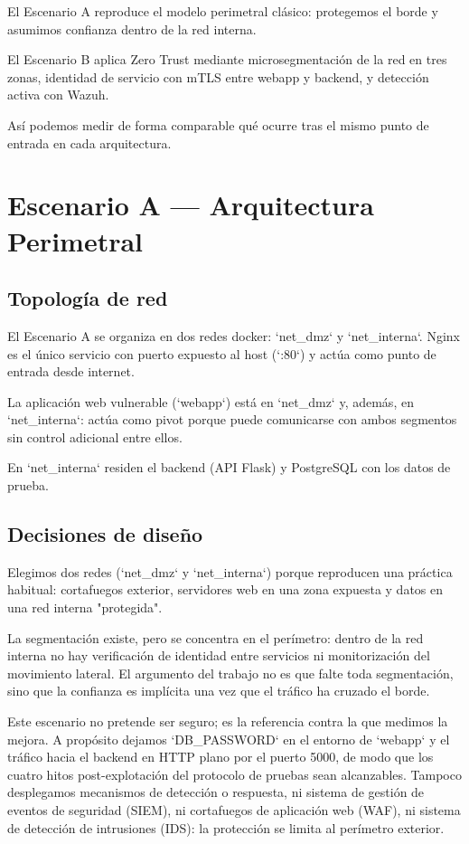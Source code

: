 \documentclass[11pt,spanish,listoffigures,listoftables]{tfgetsinf}
\begin{document}
    El Escenario A reproduce el modelo perimetral clásico: protegemos el borde y asumimos confianza dentro de la red interna. 
    
    El Escenario B aplica Zero Trust mediante microsegmentación de la red en tres zonas, identidad de servicio con mTLS entre webapp y backend, y detección activa con Wazuh. 
    
    Así podemos medir de forma comparable qué ocurre tras el mismo punto de entrada en cada arquitectura.
    
    \section{Escenario A — Arquitectura Perimetral}
        \subsection{Topología de red}
            El Escenario A se organiza en dos redes docker: `net\_dmz` y `net\_interna`. Nginx es el único servicio con puerto expuesto al host (`:80`) y actúa como punto de entrada desde internet.
            
            La aplicación web vulnerable (`webapp`) está en `net\_dmz` y, además, en `net\_interna`: actúa como pivot porque puede comunicarse con ambos segmentos sin control adicional entre ellos. 
            
            En `net\_interna` residen el backend (API Flask) y PostgreSQL con los datos de prueba.
        
        \subsection{Decisiones de diseño}
        Elegimos dos redes (`net\_dmz` y `net\_interna`) porque reproducen una práctica habitual: cortafuegos exterior, servidores web en una zona expuesta y datos en una red interna "protegida".
        
        La segmentación existe, pero se concentra en el perímetro: dentro de la red interna no hay verificación de identidad entre servicios ni monitorización del movimiento lateral. El argumento del trabajo no es que falte toda segmentación, sino que la confianza es implícita una vez que el tráfico ha cruzado el borde.
        
        Este escenario no pretende ser seguro; es la referencia contra la que medimos la mejora. A propósito dejamos `DB\_PASSWORD` en el entorno de `webapp` y el tráfico hacia el backend en HTTP plano por el puerto 5000, de modo que los cuatro hitos post-explotación del protocolo de pruebas sean alcanzables. Tampoco desplegamos mecanismos de detección o respuesta, ni sistema de gestión de eventos de seguridad (SIEM), ni cortafuegos de aplicación web (WAF), ni sistema de detección de intrusiones (IDS): la protección se limita al perímetro exterior.
        
\end{document}
